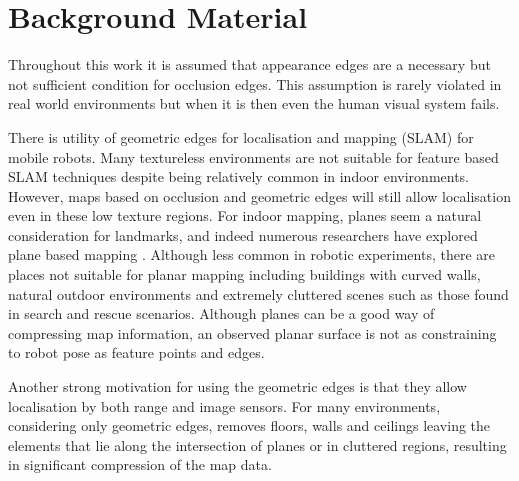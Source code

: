 \documentclass{article} %
\begin{document}
%
%

\section{Background Material}
Throughout this work it is assumed that appearance edges are a necessary but not sufficient condition for occlusion edges.
This assumption is rarely violated in real world environments but when it is then even the human visual system fails.

There is utility of geometric edges for localisation and mapping (SLAM) for mobile robots.  Many textureless environments are not suitable for feature based SLAM techniques despite being relatively common in indoor environments.  However, maps based on occlusion and geometric edges will still allow localisation even in these low texture regions.
For indoor mapping, planes seem a natural consideration for landmarks, and indeed numerous researchers have explored plane based mapping \cite{pathak2010}. %
Although less common in robotic experiments, there are places not suitable for planar mapping including buildings with curved walls, natural outdoor environments and extremely cluttered scenes such as those found in search and rescue scenarios.  Although planes can be a good way of compressing map information, an observed planar surface is not as constraining to robot pose as feature points and edges.

Another strong motivation for using the geometric edges is that they allow localisation by both range and image sensors.
For many environments, considering only geometric edges, removes floors, walls and ceilings leaving the elements that lie along the intersection of planes or in cluttered regions, resulting in significant compression of the map data.
\end{document}
